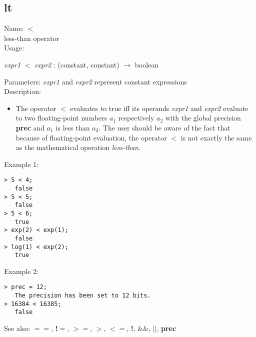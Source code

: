 \subsection{ lt }
\noindent Name: \textbf{$<$}\\
less-than operator\\

\noindent Usage: 
\begin{center}
\emph{expr1} \textbf{$<$} \emph{expr2} : (\textsf{constant}, \textsf{constant}) $\rightarrow$ \textsf{boolean}\\
\end{center}
Parameters: 
\emph{expr1} and \emph{expr2} represent constant expressions\\

\noindent Description: \begin{itemize}

\item The operator \textbf{$<$} evaluates to true iff its operands \emph{expr1} and
   \emph{expr2} evaluate to two floating-point numbers $a_1$
   respectively $a_2$ with the global precision \textbf{prec} and
   $a_1$ is less than $a_2$. The user should
   be aware of the fact that because of floating-point evaluation, the
   operator \textbf{$<$} is not exactly the same as the mathematical
   operation \emph{less-than}.
\end{itemize}
\noindent Example 1: 
\begin{center}\begin{minipage}{14.8cm}\begin{Verbatim}[frame=single]
> 5 < 4;
   false
> 5 < 5;
   false
> 5 < 6;
   true
> exp(2) < exp(1);
   false
> log(1) < exp(2);
   true
\end{Verbatim}
\end{minipage}\end{center}
\noindent Example 2: 
\begin{center}\begin{minipage}{14.8cm}\begin{Verbatim}[frame=single]
> prec = 12;
   The precision has been set to 12 bits.
> 16384 < 16385;
   false
\end{Verbatim}
\end{minipage}\end{center}
See also: \textbf{$==$}, \textbf{!$=$}, \textbf{$>=$}, \textbf{$>$}, \textbf{$<=$}, \textbf{!}, \textbf{$\&\&$}, \textbf{$||$}, \textbf{prec}
